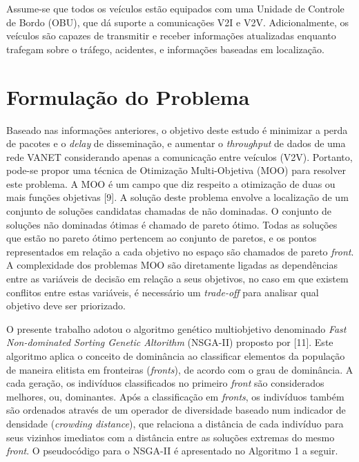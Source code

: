 \documentclass[conference]{IEEEtran}
\begin{document}

Assume-se que todos os veículos estão equipados com uma Unidade de Controle de Bordo (OBU), que dá suporte a comunicações V2I e V2V. Adicionalmente, os veículos são capazes de transmitir e receber informações atualizadas enquanto trafegam sobre o tráfego, acidentes, e informações baseadas em localização.

\section{Formulação do Problema}
\label{sec:form-problema}

Baseado nas informações anteriores, o objetivo deste estudo é minimizar a perda de pacotes e o \textit{delay} de disseminação, e aumentar o \textit{throughput} de dados de uma rede VANET considerando apenas a comunicação entre veículos (V2V). Portanto, pode-se propor uma técnica de Otimização Multi-Objetiva (MOO) para resolver este problema. A MOO é um campo que diz respeito a otimização de duas ou mais funções objetivas [9]. A solução deste problema envolve a localização de um conjunto de soluções candidatas chamadas de não dominadas. O conjunto de soluções não dominadas ótimas é chamado de pareto ótimo. Todas as soluções que estão no pareto ótimo pertencem ao conjunto de paretos, e os pontos representados em relação a cada objetivo no espaço são chamados de pareto \textit{front}. A complexidade dos problemas MOO são diretamente ligadas as dependências entre as variáveis de decisão em relação a seus objetivos, no caso em que existem conflitos entre estas variáveis, é necessário um \textit{trade-off} para analisar qual objetivo deve ser priorizado.

O presente trabalho adotou o algoritmo genético multiobjetivo denominado \textit{Fast Non-dominated Sorting Genetic Altorithm} (NSGA-II) proposto por [11]. Este algoritmo aplica o conceito de dominância ao classificar elementos da população de maneira elitista em fronteiras (\textit{fronts}), de acordo com o grau de dominância. A cada geração, os indivíduos classificados no primeiro \textit{front} são considerados melhores, ou, dominantes. Após a classificação em \textit{fronts}, os indivíduos também são ordenados através de um operador de diversidade baseado num indicador de densidade (\textit{crowding distance}), que relaciona a distância de cada indivíduo para seus vizinhos imediatos com a distância entre as soluções extremas do mesmo \textit{front}. O pseudocódigo para o NSGA-II é apresentado no Algoritmo 1 a seguir.
\end{document}
